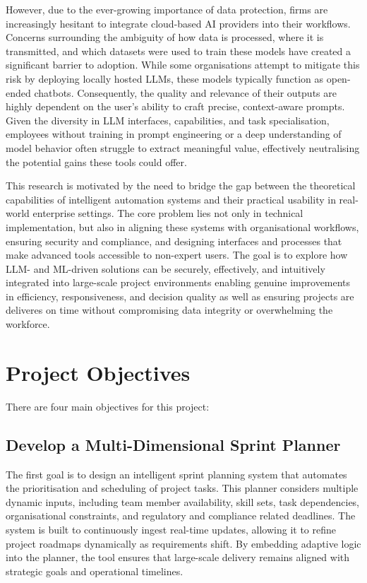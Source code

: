 \documentclass{report}
\begin{document}
However, due to the ever-growing importance of data protection, firms are increasingly hesitant to integrate cloud-based AI providers into their workflows. 
Concerns surrounding the ambiguity of how data is processed, where it is transmitted, and which datasets were used to train these models have created a significant barrier to adoption. 
While some organisations attempt to mitigate this risk by deploying locally hosted LLMs, these models typically function as open-ended chatbots. 
Consequently, the quality and relevance of their outputs are highly dependent on the user's ability to craft precise, context-aware prompts. 
Given the diversity in LLM interfaces, capabilities, and task specialisation, employees without training in prompt engineering or a deep understanding of model behavior often struggle to extract meaningful value, effectively neutralising the potential gains these tools could offer.

This research is motivated by the need to bridge the gap between the theoretical capabilities of intelligent automation systems and their practical usability in real-world enterprise settings. 
The core problem lies not only in technical implementation, but also in aligning these systems with organisational workflows, ensuring security and compliance, and designing interfaces and processes that make advanced tools accessible to non-expert users.
The goal is to explore how LLM- and ML-driven solutions can be securely, effectively, and intuitively integrated into large-scale project environments enabling genuine improvements in efficiency, responsiveness, and decision quality as well as ensuring projects are deliveres on time without compromising data integrity or overwhelming the workforce.

\section{Project Objectives}

There are four main objectives for this project:
\subsection{Develop a Multi-Dimensional Sprint Planner}
The first goal is to design an intelligent sprint planning system that automates the prioritisation and scheduling of project tasks. 
This planner considers multiple dynamic inputs, including team member availability, skill sets, task dependencies, organisational constraints, and regulatory and compliance related deadlines. 
The system is built to continuously ingest real-time updates, allowing it to refine project roadmaps dynamically as requirements shift. 
By embedding adaptive logic into the planner, the tool ensures that large-scale delivery remains aligned with strategic goals and operational timelines.
\end{document}
